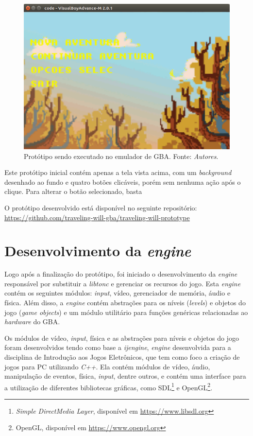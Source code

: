 \begin{figure}[H]
 \centering \includegraphics[keepaspectratio=true,scale=0.6]{figuras/tw-gba-1.eps}
   \caption[Protótipo sendo executado no emulador de GBA]
    {Protótipo sendo executado no emulador de GBA. Fonte: \textit{Autores}.}
   \label{tw-gba-1}
\end{figure}

Este protótipo inicial contém apenas a tela vista acima, com um \textit{background} desenhado ao fundo e quatro botões clicáveis, porém sem nenhuma ação após o clique. Para alterar o botão selecionado, basta

O protótipo desenvolvido está disponível no seguinte repositório: \url{https://github.com/traveling-will-gba/traveling-will-prototype}

\section{Desenvolvimento da \textit{engine}}

Logo após a finalização do protótipo, foi iniciado o desenvolvimento da \textit{engine} responsável por substituir a \textit{libtonc} e gerenciar os recursos do jogo. Esta \textit{engine} contém os seguintes módulos: \textit{input}, vídeo, gerenciador de memória, áudio e física. Além disso, a \textit{engine} contém abstrações para os níveis (\textit{levels}) e objetos do jogo (\textit{game objects}) e um módulo utilitário para funções genéricas relacionadas ao \textit{hardware} do GBA.

Os módulos de vídeo, \textit{input}, física e as abstrações para níveis e objetos do jogo foram desenvolvidos tendo como base a \textit{ijengine}, \textit{engine} desenvolvida para a disciplina de Introdução aos Jogos Eletrônicos, que tem como foco a criação de jogos para PC utilizando \textit{C++}. Ela contém módulos de vídeo, áudio, manipulação de eventos, física, \textit{input}, dentre outros, e contém uma interface para a utilização de diferentes bibliotecas gráficas, como SDL\footnote{\textit{Simple DirectMedia Layer}, disponível em \url{https://www.libsdl.org}} e OpenGL\footnote{OpenGL, disponível em \url{https://www.opengl.org}}.








